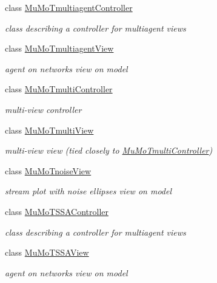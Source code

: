\begin{DoxyCompactItemize}
class \hyperlink{class_mu_mo_t_1_1_mu_mo_t_1_1_mu_mo_tmultiagent_controller}{Mu\+Mo\+Tmultiagent\+Controller}
\begin{DoxyCompactList}\small\item\em class describing a controller for multiagent views \end{DoxyCompactList}\item 
class \hyperlink{class_mu_mo_t_1_1_mu_mo_t_1_1_mu_mo_tmultiagent_view}{Mu\+Mo\+Tmultiagent\+View}
\begin{DoxyCompactList}\small\item\em agent on networks view on model \end{DoxyCompactList}\item 
class \hyperlink{class_mu_mo_t_1_1_mu_mo_t_1_1_mu_mo_tmulti_controller}{Mu\+Mo\+Tmulti\+Controller}
\begin{DoxyCompactList}\small\item\em multi-\/view controller \end{DoxyCompactList}\item 
class \hyperlink{class_mu_mo_t_1_1_mu_mo_t_1_1_mu_mo_tmulti_view}{Mu\+Mo\+Tmulti\+View}
\begin{DoxyCompactList}\small\item\em multi-\/view view (tied closely to \hyperlink{class_mu_mo_t_1_1_mu_mo_t_1_1_mu_mo_tmulti_controller}{Mu\+Mo\+Tmulti\+Controller}) \end{DoxyCompactList}\item 
class \hyperlink{class_mu_mo_t_1_1_mu_mo_t_1_1_mu_mo_tnoise_view}{Mu\+Mo\+Tnoise\+View}
\begin{DoxyCompactList}\small\item\em stream plot with noise ellipses view on model \end{DoxyCompactList}\item 
class \hyperlink{class_mu_mo_t_1_1_mu_mo_t_1_1_mu_mo_t_s_s_a_controller}{Mu\+Mo\+T\+S\+S\+A\+Controller}
\begin{DoxyCompactList}\small\item\em class describing a controller for multiagent views \end{DoxyCompactList}\item 
class \hyperlink{class_mu_mo_t_1_1_mu_mo_t_1_1_mu_mo_t_s_s_a_view}{Mu\+Mo\+T\+S\+S\+A\+View}
\begin{DoxyCompactList}\small\item\em agent on networks view on model \end{DoxyCompactList}\item 

\end{DoxyCompactItemize}
